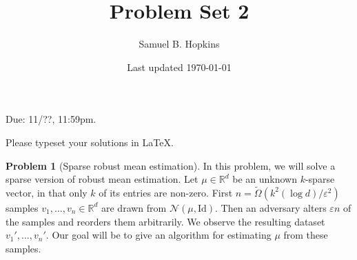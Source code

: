 \documentclass[11pt]{article}
\title{Problem Set 2}
\author{Samuel B. Hopkins}
\date{Last updated \today}
\theoremstyle{definition}
\newtheorem{problem}[theorem]{Problem}
\newcommand{\R}{\mathbb{R}} %
\renewcommand{\epsilon}{\varepsilon}
\newcommand{\Id}{\mathrm{Id}}
\begin{document}
\maketitle

Due: 11/??, 11:59pm.

Please typeset your solutions in LaTeX.

\begin{problem}[Sparse robust mean estimation]

  In this problem, we will solve a sparse version of robust mean estimation.  Let $\mu \in \R^d$ be an unknown $k$-sparse vector, in that only $k$ of its entries are non-zero.  First $n = \widetilde{\Omega}(k^2 (\log d)/\epsilon^2)$ samples $v_1, \dots, v_n \in \R^d$ are drawn from $\mathcal{N}(\mu, \Id)$. Then an adversary alters $\epsilon n$ of the samples and reorders them arbitrarily.  We observe the resulting dataset $v_1', \dots , v_n'$.   Our goal will be to give an algorithm for estimating $\mu$ from these samples.


\end{problem}
\end{document}
